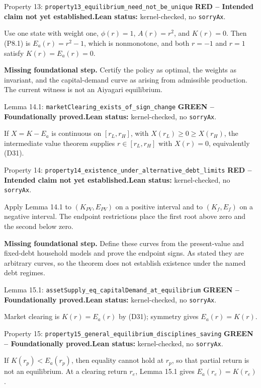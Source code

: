 \documentclass[11pt]{article}
\newcommand{\leanname}[1]{\nolinkurl{#1}}
\newcommand{\formalcheck}{\textbf{Lean status:} kernel-checked, no \texttt{sorryAx}.}
\newcommand{\missing}[1]{\par\smallskip\textbf{Missing foundational step.} #1}
\newcommand{\greenstatus}{\textcolor{proved}{\textbf{GREEN -- Foundationally proved.}}}
\newcommand{\redstatus}{\textcolor{incomplete}{\textbf{RED -- Intended claim not yet established.}}}
\begin{document}
\begin{redbox}{Property 13: \leanname{property13_equilibrium_need_not_be_unique}}
\redstatus\quad\formalcheck

Use one state with weight one, \(\phi(r)=1\), \(A(r)=r^2\), and \(K(r)=0\).
Then (P8.1) is \(E_a(r)=r^2-1\), which is nonmonotone, and both \(r=-1\) and
\(r=1\) satisfy \(K(r)=E_a(r)=0\).

\missing{Certify the policy as optimal, the weights as invariant, and the
capital-demand curve as arising from admissible production.  The current
witness is not an Aiyagari equilibrium.}
\end{redbox}

\begin{greenbox}{Lemma 14.1: \leanname{marketClearing_exists_of_sign_change}}
\greenstatus\quad\formalcheck

If \(X=K-E_a\) is continuous on \([r_L,r_H]\), with
\(X(r_L)\ge0\ge X(r_H)\), the intermediate value theorem supplies
\(r\in[r_L,r_H]\) with \(X(r)=0\), equivalently (D31).
\end{greenbox}

\begin{redbox}{Property 14: \leanname{property14_existence_under_alternative_debt_limits}}
\redstatus\quad\formalcheck

Apply Lemma 14.1 to \((K_{PV},E_{PV})\) on a positive interval and to
\((K_f,E_f)\) on a negative interval.  The endpoint restrictions place the
first root above zero and the second below zero.

\missing{Define these curves from the present-value and fixed-debt household
models and prove the endpoint signs.  As stated they are arbitrary curves, so
the theorem does not establish existence under the named debt regimes.}
\end{redbox}

\begin{greenbox}{Lemma 15.1: \leanname{assetSupply_eq_capitalDemand_at_equilibrium}}
\greenstatus\quad\formalcheck

Market clearing is \(K(r)=E_a(r)\) by (D31); symmetry gives
\(E_a(r)=K(r)\).
\end{greenbox}

\begin{greenbox}{Property 15: \leanname{property15_general_equilibrium_disciplines_saving}}
\greenstatus\quad\formalcheck

If \(K(r_p)<E_a(r_p)\), then equality cannot hold at \(r_p\), so that partial
return is not an equilibrium.  At a clearing return \(r_e\), Lemma 15.1 gives
\(E_a(r_e)=K(r_e)\).
\end{greenbox}
\end{document}
